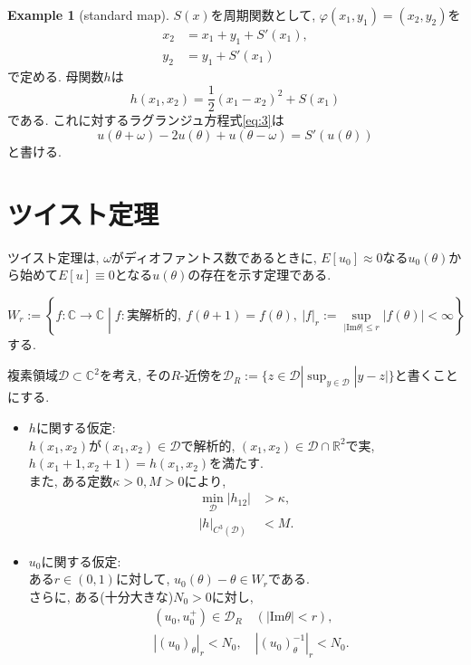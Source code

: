 \documentclass[a4paper]{ujarticle}
\numberwithin{equation}{section}
\theoremstyle{definition}
\newtheorem{example}{Example}
\begin{document}
        \begin{example}[standard map]
            $S(x)$を周期関数として, $\varphi(x_1, y_1) = (x_2, y_2)$を
            \begin{align}
                x_2 &= x_1 + y_1 + S'(x_1), \\
                y_2 &= y_1 + S'(x_1)
            \end{align}
            で定める. 母関数$h$は
            \[
                h(x_1, x_2) = \frac{1}{2}(x_1 - x_2)^2 + S(x_1)
            \]
            である. これに対するラグランジュ方程式\eqref{eq:3}は
            \[
                u(\theta + \omega) - 2 u(\theta) + u(\theta - \omega) = S'(u(\theta))
            \]
            と書ける.
        \end{example}

    \section{ツイスト定理}

        ツイスト定理は, $\omega$がディオファントス数であるときに,
        $E[u_0] \approx 0$なる$u_0(\theta)$から始めて$E[u] \equiv 0$となる$u(\theta)$の存在を示す定理である.
        
        \[
            W_r := \left\{f: \mathbb{C} \rightarrow \mathbb{C} \middle| f : \text{実解析的}, \ f(\theta + 1) = f(\theta), \ |f|_r := \sup_{|\mathrm{Im} \theta| \leq r} |f(\theta)| < \infty \right\}
        \]
        する.

        複素領域$\mathcal{D} \subset \mathbb{C}^2$を考え, その$R$-近傍を$\mathcal{D}_{R} := \{z \in \mathcal{D} | \sup_{y \in \mathcal{D}}|y - z| \}$と書くことにする.
        \begin{itemize}
            \item $h$に関する仮定: \\
            $h(x_1, x_2)$が$(x_1, x_2) \in \mathcal{D}$で解析的, $(x_1, x_2) \in \mathcal{D} \cap \mathbb{R}^2$で実, 
            $h(x_1 + 1, x_2 + 1) = h(x_1, x_2)$を満たす. \\
            また, ある定数$\kappa > 0, M > 0$により, 
            \begin{align}
                \min_{\mathcal{D}} |h_{12}| &> \kappa, \label{eq:5} \\
                |h|_{C^3(\mathcal{D})} &< M. \label{eq:6}
            \end{align}
            \item $u_0$に関する仮定: \\
            ある$r \in (0, 1)$に対して, $u_0(\theta) - \theta \in W_r$である. \\
            さらに, ある(十分大きな)$N_0 > 0$に対し, 
            \begin{align}
                &(u_0, u^{+}_0) \in \mathcal{D}_{R} \quad (|\mathrm{Im} \theta| < r) \label{eq:7}, \\
                &|(u_0)_{\theta}|_r < N_0, \quad |(u_0)^{-1}_{\theta}|_r < N_0. \label{eq:8}
            \end{align}
        \end{itemize}
\end{document}
